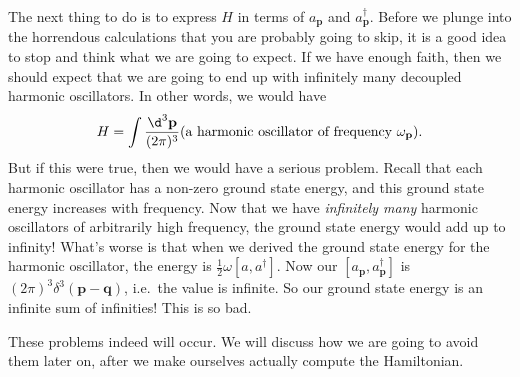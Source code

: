 \documentclass[a4paper]{article}
\begin{document}
The next thing to do is to express $H$ in terms of $a_\mathbf{p}$ and $a_\mathbf{p}^\dagger$. Before we plunge into the horrendous calculations that you are probably going to skip, it is a good idea to stop and think what we are going to expect. If we have enough faith, then we should expect that we are going to end up with infinitely many decoupled harmonic oscillators. In other words, we would have
\[
  H = \int \frac{\d^3 \mathbf{p}}{(2\pi)^3} (\text{a harmonic oscillator of frequency $\omega_\mathbf{p}$}).
\]
But if this were true, then we would have a serious problem. Recall that each harmonic oscillator has a non-zero ground state energy, and this ground state energy increases with frequency. Now that we have \emph{infinitely many} harmonic oscillators of arbitrarily high frequency, the ground state energy would add up to infinity! What's worse is that when we derived the ground state energy for the harmonic oscillator, the energy is $\frac{1}{2}\omega [a, a^\dagger]$. Now our $[a_\mathbf{p}, a_\mathbf{p}^\dagger]$ is $(2\pi)^3 \delta^3(\mathbf{p} - \mathbf{q})$, i.e.\ the value is infinite. So our ground state energy is an infinite sum of infinities! This is so bad.

These problems indeed will occur. We will discuss how we are going to avoid them later on, after we make ourselves actually compute the Hamiltonian.
\end{document}
